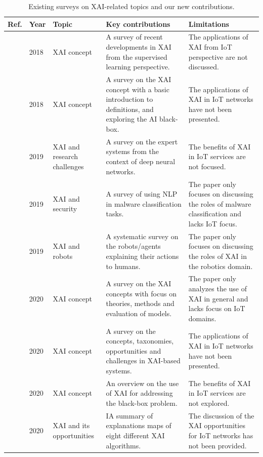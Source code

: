 \documentclass[journal]{IEEEtran}
\begin{document}
\begin{table}[!ht]
\centering
\caption{Existing surveys on XAI-related topics and our new contributions.} 
\label{tab:surveys}
\begin{tabular}{|p{0.45cm}|p{0.5cm}|p{2.0cm}|p{7.45cm}|p{5.5cm}|}
\hline
\textbf{Ref.} & \textbf{Year} & \textbf{Topic} & \textbf{Key contributions} & \textbf{Limitations}\\ \hline
\hline
\cite{dovsilovic2018explainable}  & 2018 & XAI concept  & A survey of recent developments in XAI from the supervised learning perspective. &  The applications of XAI from IoT perspective are not discussed. \\ \hline
\cite{adadi2018peeking}  & 2018 & XAI concept & A survey on the XAI concept with a basic introduction to
definitions, and exploring the AI black-box. & The applications of XAI in IoT networks have
not been presented.\\ \hline
\cite{xu2019explainable}  & 2019 & XAI and research challenges & A survey on the expert systems from the context of deep neural networks. & The benefits of XAI in IoT services are not focused.  \\ \hline
\cite{mathews2019explainable}  & 2019 & XAI and security & A survey of using NLP in malware classification tasks. & The paper only focuses on discussing the roles of malware classification and lacks IoT focus.  \\ \hline
\cite{anjomshoae2019explainable}  & 2019 &  XAI and robots & A systematic survey on the robots/agents explaining their actions to humans. & The paper only focuses on discussing the roles of XAI in the robotics domain.    \\ \hline
\cite{vilone2020explainable}  & 2020 & XAI concept  & A survey on the XAI concepts with focus on theories, methods and evaluation of models. &  The paper only analyzes the use of XAI in general and lacks focus on IoT domains.\\ \hline
\cite{arrieta2020explainable}  & 2020 & XAI concept & A survey on the concepts, taxonomies, opportunities and challenges in XAI-based systems. & The applications of XAI in IoT networks have not been presented.  \\ \hline
\cite{gerlings2020reviewing}  & 2020 & XAI concept & An overview on the use of XAI for addressing the black-box problem. & The benefits of XAI in IoT services are not explored.  \\ \hline
\cite{das2020opportunities}  & 2020 & XAI and its opportunities & IA summary of explanations maps of eight different XAI algorithms. &  The discussion of the XAI opportunities for IoT networks has not been provided. \\ \hline

\end{tabular}
\end{table}
\end{document}
